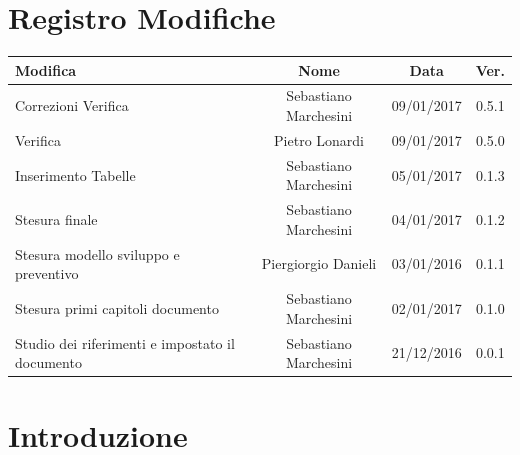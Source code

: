 \documentclass[12pt,a4paper,titlepage]{article}
\begin{document}
	
	
	\clearpage %
	

\chead{}
\cfoot{}
\rfoot{\thepage}
\renewcommand{\headrulewidth}{0.2pt}
\renewcommand{\footrulewidth}{0.2pt}
	
	\section{Registro Modifiche}
	\small %
	
	{\renewcommand\arraystretch{1.2}  %
		\begin{tabular}{|l|c|c|c|}
			\hline
			{\textbf{Modifica}}&{\textbf{Nome}}&{\textbf{Data}}&{\textbf{Ver.}}\\
			\hline
			Correzioni Verifica & Sebastiano Marchesini & 09/01/2017 & 0.5.1 \\
			\hline
			Verifica & Pietro Lonardi & 09/01/2017 & 0.5.0 \\
			\hline
			Inserimento Tabelle & Sebastiano Marchesini & 05/01/2017 & 0.1.3 \\
			\hline
			Stesura finale & Sebastiano Marchesini & 04/01/2017 & 0.1.2 \\
			\hline
			Stesura modello sviluppo e preventivo & Piergiorgio Danieli & 03/01/2016 & 0.1.1 \\
			\hline
			Stesura primi capitoli documento & Sebastiano Marchesini & 02/01/2017 & 0.1.0 \\
			\hline
			Studio dei riferimenti e impostato il documento & Sebastiano Marchesini & 21/12/2016 & 0.0.1 \\
			\hline
		\end{tabular}
	}
	\normalsize
	
	\newpage
	
	\tableofcontents
	\thispagestyle{empty}
	
	\newpage
	
	
	\section{Introduzione}
\end{document}

